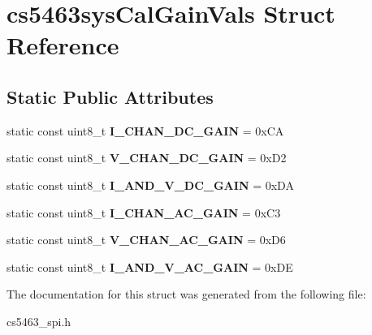 \hypertarget{structcs5463sysCalGainVals}{\section{cs5463sys\-Cal\-Gain\-Vals Struct Reference}
\label{structcs5463sysCalGainVals}
}
\subsection*{Static Public Attributes}
\begin{DoxyCompactItemize}
\item 
\hypertarget{structcs5463sysCalGainVals_aa3cd084b170af11b56082bb0cd05d46d}{static const uint8\-\_\-t {\bfseries I\-\_\-\-C\-H\-A\-N\-\_\-\-D\-C\-\_\-\-G\-A\-I\-N} = 0x\-C\-A}\label{structcs5463sysCalGainVals_aa3cd084b170af11b56082bb0cd05d46d}

\item 
\hypertarget{structcs5463sysCalGainVals_ae30afd0d60a3e489c179dd8e4e94cb34}{static const uint8\-\_\-t {\bfseries V\-\_\-\-C\-H\-A\-N\-\_\-\-D\-C\-\_\-\-G\-A\-I\-N} = 0x\-D2}\label{structcs5463sysCalGainVals_ae30afd0d60a3e489c179dd8e4e94cb34}

\item 
\hypertarget{structcs5463sysCalGainVals_a79e875dc5137298a2ea06e9199fea354}{static const uint8\-\_\-t {\bfseries I\-\_\-\-A\-N\-D\-\_\-\-V\-\_\-\-D\-C\-\_\-\-G\-A\-I\-N} = 0x\-D\-A}\label{structcs5463sysCalGainVals_a79e875dc5137298a2ea06e9199fea354}

\item 
\hypertarget{structcs5463sysCalGainVals_aefe1ae2f262bd5e323d29774e7f023ba}{static const uint8\-\_\-t {\bfseries I\-\_\-\-C\-H\-A\-N\-\_\-\-A\-C\-\_\-\-G\-A\-I\-N} = 0x\-C3}\label{structcs5463sysCalGainVals_aefe1ae2f262bd5e323d29774e7f023ba}

\item 
\hypertarget{structcs5463sysCalGainVals_a517bbf6253232087ff21d55ddae7045f}{static const uint8\-\_\-t {\bfseries V\-\_\-\-C\-H\-A\-N\-\_\-\-A\-C\-\_\-\-G\-A\-I\-N} = 0x\-D6}\label{structcs5463sysCalGainVals_a517bbf6253232087ff21d55ddae7045f}

\item 
\hypertarget{structcs5463sysCalGainVals_aa27c74c8c8affbdd1a786cbee5aaf48c}{static const uint8\-\_\-t {\bfseries I\-\_\-\-A\-N\-D\-\_\-\-V\-\_\-\-A\-C\-\_\-\-G\-A\-I\-N} = 0x\-D\-E}\label{structcs5463sysCalGainVals_aa27c74c8c8affbdd1a786cbee5aaf48c}

\end{DoxyCompactItemize}


The documentation for this struct was generated from the following file\-:\begin{DoxyCompactItemize}
\item 
cs5463\-\_\-spi.\-h\end{DoxyCompactItemize}
